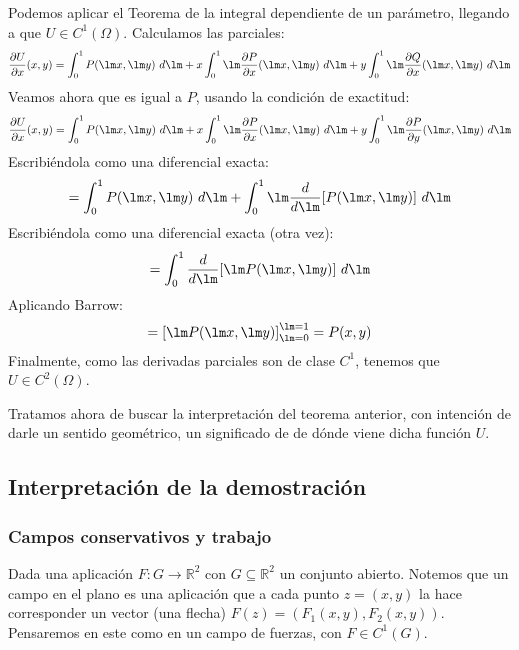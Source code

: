 Podemos aplicar el Teorema de la integral dependiente de un parámetro, llegando a que $U\in C^1(\Omega)$.
Calculamos las parciales:
\begin{equation*}
    \dfrac{\partial U}{\partial x}(x,y) = \int_{0}^{1} P(\lm x,\lm y)~d\lm + x\int_{0}^{1} \lm \dfrac{\partial P}{\partial x}(\lm x,\lm y)~d\lm + y\int_{0}^{1} \lm \dfrac{\partial Q}{\partial x}(\lm x,\lm y)~d\lm 
\end{equation*}
Veamos ahora que es igual a $P$, usando la condición de exactitud:
\begin{equation*}
    \dfrac{\partial U}{\partial x}(x,y) = \int_{0}^{1} P(\lm x,\lm y)~d\lm +  x\int_{0}^{1} \lm\dfrac{\partial P}{\partial x}(\lm x,\lm y)~d\lm  + y\int_{0}^{1} \lm \dfrac{\partial P}{\partial y}(\lm x,\lm y)~d\lm 
\end{equation*}
Escribiéndola como una diferencial exacta:
\begin{equation*}
    = \int_{0}^{1} P(\lm x,\lm y)~d\lm + \int_{0}^{1} \lm \dfrac{d}{d\lm}[P(\lm x, \lm y)]~d\lm  
\end{equation*}
Escribiéndola como una diferencial exacta (otra vez):
\begin{equation*}
    = \int_{0}^{1} \dfrac{d}{d\lm}[\lm P(\lm x,\lm y)]~d\lm 
\end{equation*}
Aplicando Barrow:
\begin{equation*}
    = {[\lm P(\lm x,\lm y)]}_{\lm = 0}^{\lm = 1} = P(x,y)
\end{equation*}
Finalmente, como las derivadas parciales son de clase $C^1$, tenemos que $U\in C^2(\Omega)$.


Tratamos ahora de buscar la interpretación del teorema anterior, con intención de darle un sentido geométrico, un significado de de dónde viene dicha función $U$.

\subsection{Interpretación de la demostración}
\subsubsection{Campos conservativos y trabajo}
Dada una aplicación $F:G\rightarrow\mathbb{R}^2$ con $G\subseteq \mathbb{R}^2$ un conjunto abierto.
Notemos que un campo en el plano es una aplicación que a cada punto $z=(x,y)$ la hace corresponder un vector (una flecha) $F(z) = (F_1(x,y), F_2(x,y))$.
Pensaremos en este como en un campo de fuerzas, con $F\in C^1(G)$.


